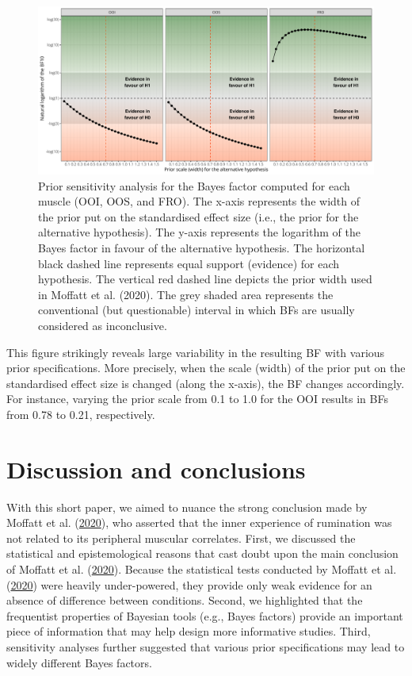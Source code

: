 \documentclass[
  man, donotrepeattitle,floatsintext]{apa6}
\begin{document}
\begin{figure}[!h]

{\centering \includegraphics[width=1\linewidth]{manuscript_files/figure-latex/sensitivity-1} 

}

\caption{Prior sensitivity analysis for the Bayes factor computed for each muscle (OOI, OOS, and FRO). The x-axis represents the width of the prior put on the standardised effect size (i.e., the prior for the alternative hypothesis). The y-axis represents the logarithm of the Bayes factor in favour of the alternative hypothesis. The horizontal black dashed line represents equal support (evidence) for each hypothesis. The vertical red dashed line depicts the prior width used in Moffatt et al. (2020). The grey shaded area represents the conventional (but questionable) interval in which BFs are usually considered as inconclusive.}\label{fig:sensitivity}
\end{figure}

This figure strikingly reveals large variability in the resulting BF with various prior specifications. More precisely, when the scale (width) of the prior put on the standardised effect size is changed (along the x-axis), the BF changes accordingly. For instance, varying the prior scale from 0.1 to 1.0 for the OOI results in BFs from 0.78 to 0.21, respectively.

\hypertarget{discussion-and-conclusions}{%
\section{Discussion and conclusions}\label{discussion-and-conclusions}}

With this short paper, we aimed to nuance the strong conclusion made by Moffatt et al. (\protect\hyperlink{ref-moffatt_inner_2020}{2020}), who asserted that the inner experience of rumination was not related to its peripheral muscular correlates. First, we discussed the statistical and epistemological reasons that cast doubt upon the main conclusion of Moffatt et al. (\protect\hyperlink{ref-moffatt_inner_2020}{2020}). Because the statistical tests conducted by Moffatt et al. (\protect\hyperlink{ref-moffatt_inner_2020}{2020}) were heavily under-powered, they provide only weak evidence for an absence of difference between conditions. Second, we highlighted that the frequentist properties of Bayesian tools (e.g., Bayes factors) provide an important piece of information that may help design more informative studies. Third, sensitivity analyses further suggested that various prior specifications may lead to widely different Bayes factors.
\end{document}
